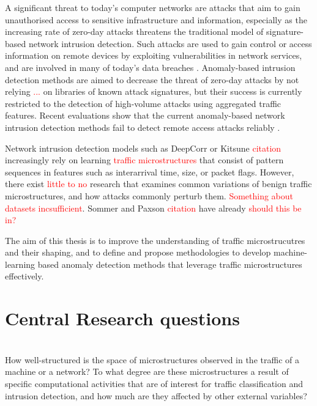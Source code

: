 
A significant threat to today's computer networks are attacks that aim to gain unauthorised access to sensitive infrastructure and information, especially as the increasing rate of zero-day attacks \cite{zeroday} threatens the traditional model of signature-based network intrusion detection. Such attacks are used to gain control or access information on remote devices by exploiting vulnerabilities in network services, and are involved in many of today's data breaches \cite{mandiant2015trends}.
Anomaly-based intrusion detection methods are aimed to decrease the threat of zero-day attacks by not relying \textcolor{red}{...} on libraries of known attack signatures, but their success is currently restricted to the detection of high-volume attacks using aggregated traffic features. Recent evaluations show that the current anomaly-based network intrusion detection methods fail to detect remote access attacks reliably \cite{nisioti2018intrusion}. 

Network intrusion detection models such as DeepCorr or Kitsune \textcolor{red}{citation} increasingly rely on learning \textcolor{red}{traffic microstructures} that consist of pattern sequences in features such as interarrival time, size, or packet flags. However, there exist \textcolor{red}{little to no} research that examines common variations of benign traffic microstructures, and how attacks commonly perturb them. \textcolor{red}{Something about datasets incsufficient}. 
Sommer and Paxson \textcolor{red}{citation} have already \textcolor{red}{should this be in?}

The aim of this thesis is to improve the understanding of traffic microstrucutres and their shaping, and to define and propose methodologies to develop machine-learning based anomaly detection methods that leverage traffic microstructures effectively.



\section{Central Research questions}\label{Sec:Reseach_questions}

\begin{rquestion}\ \\ 
How well-structured is the space of microstructures observed in the traffic of a machine or a network? To what degree are these microstructures a result of specific computational activities that are of interest for traffic classification and intrusion detection, and how much are they affected by other external variables?

\end{rquestion}



